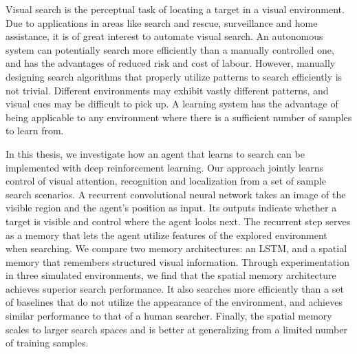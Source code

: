 Visual search is the perceptual task of locating a target in a visual environment.
Due to applications in areas like search and rescue, surveillance and home assistance, it is of great interest to automate visual search.
An autonomous system can potentially search more efficiently than a manually controlled one, and has the advantages of reduced risk and cost of labour.
However, manually designing search algorithms that properly utilize patterns to search efficiently is not trivial.
Different environments may exhibit vastly different patterns, and visual cues may be difficult to pick up.
A learning system has the advantage of being applicable to any environment where there is a sufficient number of samples to learn from.

In this thesis, we investigate how an agent that learns to search can be implemented with deep reinforcement learning.
Our approach jointly learns control of visual attention, recognition and localization from a set of sample search scenarios.
A recurrent convolutional neural network takes an image of the visible region and the agent's position as input.
Its outputs indicate whether a target is visible and control where the agent looks next.
The recurrent step serves as a memory that lets the agent utilize features of the explored environment when searching.
We compare two memory architectures: an LSTM, and a spatial memory that remembers structured visual information.
Through experimentation in three simulated environments, we find that the spatial memory architecture achieves superior search performance.
It also searches more efficiently than a set of baselines that do not utilize the appearance of the environment, and achieves similar performance to that of a human searcher.
Finally, the spatial memory scales to larger search spaces and is better at generalizing from a limited number of training samples.
